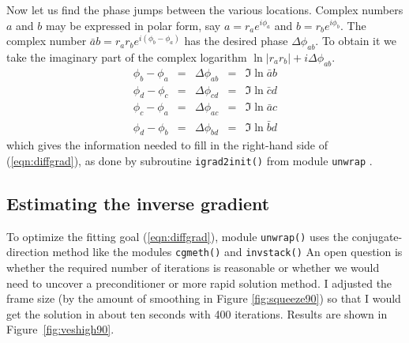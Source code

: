 Now let us find the phase jumps between the various locations. Complex numbers $a$ and $b$ may be expressed in polar form, say $a=r_ae^{i\phi_a}$ and $b=r_be^{i\phi_b}$.
The complex number 
$\bar a b = r_a r_b e^{i(\phi_b-\phi_a)}$ has the desired phase
$\Delta \phi_{ab}$.
To obtain it we take the imaginary part of the complex logarithm
$\ln |r_a r_b| + i\Delta \phi_{ab}$.
\begin{equation}
  \begin{array}{lllll}
        \phi_b-\phi_a &=& \Delta \phi_{ab} &=& \Im \ln  \bar a b\\
        \phi_d-\phi_c &=& \Delta \phi_{cd} &=& \Im \ln  \bar c d\\
        \phi_c-\phi_a &=& \Delta \phi_{ac} &=& \Im \ln  \bar a c\\
        \phi_d-\phi_b &=& \Delta \phi_{bd} &=& \Im \ln  \bar b d
  \end{array}
\label{eqn:thedeltas}
\end{equation}
which gives the information needed to fill in the right-hand side of
(\ref{eqn:diffgrad}), as done by subroutine \texttt{igrad2init()} from
module \texttt{unwrap} .
\subsection{Estimating the inverse gradient}
To optimize the fitting goal (\ref{eqn:diffgrad}),
module \texttt{unwrap()} uses the conjugate-direction method
like the modules \texttt{cgmeth()}
and 
\texttt{invstack()}
An open question is whether the required number of iterations is reasonable
or whether we would need to uncover a preconditioner
or more rapid solution method.
I adjusted the frame size 
(by the amount of smoothing in Figure \ref{fig:squeeze90})
so that I would get the solution in about ten seconds with 400 iterations.
Results are shown in Figure~\ref{fig:veshigh90}.

\begin{comment}
When we are working with figures like Figure~\ref{fig:veshigh90},
the number of iterations often exceeds the number of intermediate
output frames that we care to deal with.
The computer function \texttt{klick()} is a simple tool
to detect logarithmically spaced intervals for taking snapshots
of iterative descent.
\progdex{klick}{Logarithmic increment detect}
\end{comment}

